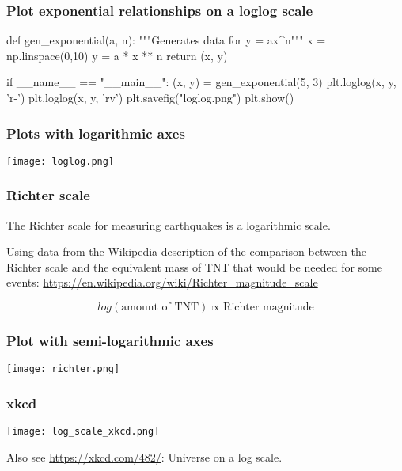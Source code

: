 \documentclass{beamer}
\begin{document}
\begin{frame}[fragile]
\frametitle{Plot exponential relationships on a loglog scale}
\begin{code}
def gen_exponential(a, n):
    """Generates data for y = ax^n"""
    x = np.linspace(0,10)
    y = a * x ** n
    return (x, y)

if __name__ == "__main__":
    (x, y) = gen_exponential(5, 3)
    plt.loglog(x, y, 'r-')
    plt.loglog(x, y, 'rv')
    plt.savefig("loglog.png")
    plt.show()
\end{code}
\end{frame}



\begin{frame}[fragile]
\frametitle{Plots with logarithmic axes}
\texttt{[image: loglog.png]}
\end{frame}

\begin{frame}[fragile]
\frametitle{Richter scale}
The Richter scale for measuring earthquakes is a logarithmic scale.

\bigskip

Using data from the Wikipedia description of the comparison between the Richter scale and the equivalent mass of TNT that would be needed for some events:
\url{https://en.wikipedia.org/wiki/Richter_magnitude_scale}

\bigskip

\[ log( \textrm{amount of TNT}) \propto \textrm{Richter magnitude}\]
\end{frame}

\begin{frame}[fragile]
\frametitle{Plot with semi-logarithmic axes}
\texttt{[image: richter.png]}

\end{frame}

\begin{frame}[fragile]
\frametitle{xkcd}
\texttt{[image: log\_scale\_xkcd.png]}

\bigskip

Also see \url{https://xkcd.com/482/}: Universe on a log scale.
\end{frame}
\end{document}
